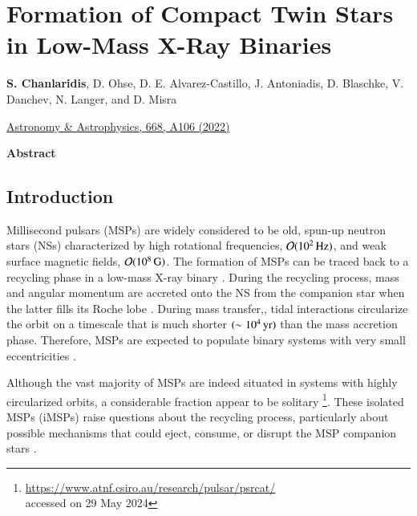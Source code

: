 \documentclass[main.tex]{subfiles}
\begin{document}
    \chapter[Formation of Compact Twin Stars in Low-Mass X-Ray Binaries]{Formation of Compact Twin Stars in Low-Mass X-Ray Binaries}


        \begin{center}
        \textbf{S. Chanlaridis}, D. Ohse, D. E. Alvarez-Castillo, J. Antoniadis, D. Blaschke, V. Danchev, N. Langer, and D. Misra   \\
        \begin{center}
            \href{https://www.aanda.org/articles/aa/full_html/2022/12/aa43035-22/aa43035-22.html}{Astronomy \& Astrophysics, 668, A106 (2022)}
        \end{center}
    \end{center}
        
        
    \begin{center}
        \textbf{\large Abstract}
    \end{center}
    
    {
        \minitoc
        \newpage
    }
    
    \section{Introduction} \label{sec:intro}
        Millisecond pulsars (MSPs) are widely considered to be old, spun-up neutron stars (NSs) characterized by high rotational frequencies, $\mathcal{O}(10^2\,\rm Hz)$, and weak surface magnetic fields, $\mathcal{O}(10^8\,\rm G)$. The formation of MSPs can be traced back to a recycling
        phase in a low-mass X-ray binary \citep[LMXB; see][]{Tauris:2023nmj}. 
        During the recycling process,  mass and angular momentum are accreted onto the NS from the companion star when the latter fills its Roche lobe \citep[e.g.,][and references therein]{Bhattacharya:1991pre, Tauris:aap1999, Tauris:2023nmj}. During mass transfer,, tidal interactions circularize the orbit on a timescale that is much shorter $(\sim 10^4\,\rm yr)$ than the  mass accretion phase. Therefore, MSPs are expected to populate binary systems with very small eccentricities \citep{Phinney:1992, Verbunt:aa1995}.
        
        Although the vast majority of MSPs are indeed situated in systems with highly circularized orbits, a considerable fraction  appear to be solitary \citep[$\sim 27$\% among known MSPs with spin periods $\leq 30$\,ms; see the ATNF pulsar catalogue;][]{Manchester_2005}\footnote{\url{https://www.atnf.csiro.au/research/pulsar/psrcat/}\\ accessed on 29 May 2024}. These isolated MSPs (iMSPs) raise questions about the recycling process, particularly about possible mechanisms that could eject, consume, or disrupt the MSP companion stars \citep{1987Natur.329..312V, 2019PASA...36....5S, 2019JApA...40...32N, 2020A&A...633A..45J}. 
        
\end{document}
